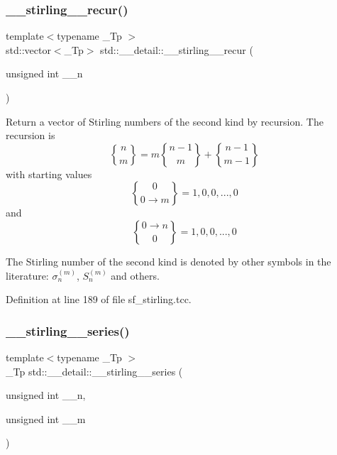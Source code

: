 \mbox{\label{namespacestd_1_1____detail_aa7c6f36dc1f75cd38af10ca232e62f06}} 
\subsubsection{\texorpdfstring{\+\_\+\+\_\+stirling\+\_\+\_\+recur()}{\_\_stirling\_2\_recur()}\hspace{0.1cm}{\footnotesize\ttfamily [2/2]}}
{\footnotesize\ttfamily template$<$typename \+\_\+\+Tp $>$ \\
std\+::vector$<$\+\_\+\+Tp$>$ std\+::\+\_\+\+\_\+detail\+::\+\_\+\+\_\+stirling\+\_\+\_\+recur (\begin{DoxyParamCaption}\item[{unsigned int}]{\+\_\+\+\_\+n }\end{DoxyParamCaption})}

Return a vector of Stirling numbers of the second kind by recursion. The recursion is \[ \genfrac{\{}{\}}{0pt}{0}{n}{m} = m \genfrac{\{}{\}}{0pt}{0}{n-1}{m} + \genfrac{\{}{\}}{0pt}{0}{n-1}{m-1} \] with starting values \[ \genfrac{\{}{\}}{0pt}{0}{0}{0\rightarrow m} = {1, 0, 0, ..., 0} \] and \[ \genfrac{\{}{\}}{0pt}{0}{0\rightarrow n}{0} = {1, 0, 0, ..., 0} \]

The Stirling number of the second kind is denoted by other symbols in the literature\+: $ \sigma_n^{(m)} $, $ \textit{S}_n^{(m)} $ and others. 

Definition at line 189 of file sf\+\_\+stirling.\+tcc.

\mbox{\label{namespacestd_1_1____detail_a8408f17699eb43a14447c7e4795b277f}} 
\subsubsection{\texorpdfstring{\+\_\+\+\_\+stirling\+\_\+\_\+series()}{\_\_stirling\_2\_series()}}
{\footnotesize\ttfamily template$<$typename \+\_\+\+Tp $>$ \\
\+\_\+\+Tp std\+::\+\_\+\+\_\+detail\+::\+\_\+\+\_\+stirling\+\_\+\_\+series (\begin{DoxyParamCaption}\item[{unsigned int}]{\+\_\+\+\_\+n,  }\item[{unsigned int}]{\+\_\+\+\_\+m }\end{DoxyParamCaption})}

